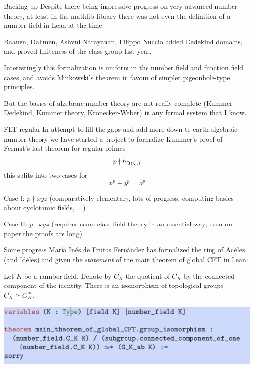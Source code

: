 \begin{frame}{Backing up}
    Despite there being impressive progress on very advanced number theory, at least in the mathlib library there was not even the definition of a number field in Lean at the time

    Baanen, Dahmen, Ashvni Narayanan, Filippo Nuccio added Dedekind domains, and proved finiteness of the class group last year.

    Interestingly this formalization is uniform in the number field and function field cases, and avoids Minkowski's theorem in favour of simpler pigeonhole-type principles.

    But the basics of algebraic number theory are not really complete (Kummer-Dedekind, Kummer theory, Kronecker-Weber) in any formal system that I know.
\end{frame}

\begin{frame}{FLT-regular}
    In attempt to fill the gaps and add more down-to-earth algebraic number theory we have started a project to formalize Kummer's proof of Fermat's last theorem for regular primes
    $$p \nmid h_{\mathbf Q(\zeta_p)}$$
    this splits into two cases for
    $$x^p + y^p = z^p$$

    Case I: $p\nmid xyz$ (comparatively elementary, lots of progress, computing basics about cyclotomic fields, ...)

    Case II: $p\mid xyz$ (requires some class field theory in an essential way, even on paper the proofs are long)
\end{frame}

\begin{frame}{Some progress}
    María Inés de Frutos Fernández has formalized the ring of Adèles (and Idèles) and given the \emph{statement} of the main theorem of global CFT in Lean:
    \begin{theorem}
        Let $K$ be a number field. Denote by $C_{K}^{1}$ the quotient of $C_{K}$ by the connected component of the identity. There is an isomorphism of topological groups $C_{K}^{1} \simeq G_{K}^{a b}$.
    \end{theorem}
    \includegraphics[width=\textwidth]{maria.png}
\end{frame}

